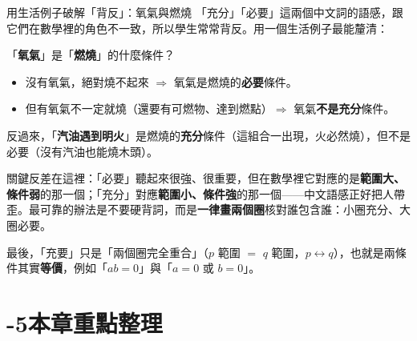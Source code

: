 \documentclass[11pt]{article}
\begin{document}
\begin{補充框}{用生活例子破解「背反」：氧氣與燃燒}
「充分」「必要」這兩個中文詞的語感，跟它們在數學裡的角色不一致，所以學生常常背反。用一個生活例子最能釐清：

「\textbf{氧氣}」是「\textbf{燃燒}」的什麼條件？
\begin{itemize}\setlength{\itemsep}{1pt}
\item 沒有氧氣，絕對燒不起來 $\Rightarrow$ 氧氣是燃燒的\textbf{必要}條件。
\item 但有氧氣不一定就燒（還要有可燃物、達到燃點）$\Rightarrow$ 氧氣\textbf{不是充分}條件。
\end{itemize}
反過來，「\textbf{汽油遇到明火}」是燃燒的\textbf{充分}條件（這組合一出現，火必然燒），但不是必要（沒有汽油也能燒木頭）。

關鍵反差在這裡：「必要」聽起來很強、很重要，但在數學裡它對應的是\textbf{範圍大、條件弱}的那一個；「充分」對應\textbf{範圍小、條件強}的那一個——中文語感正好把人帶歪。最可靠的辦法是不要硬背詞，而是\textbf{一律畫兩個圈}核對誰包含誰：小圈充分、大圈必要。

最後，「充要」只是「兩個圈完全重合」（$p$ 範圍 $=$ $q$ 範圍，$p\leftrightarrow q$），也就是兩條件其實\textbf{等價}，例如「$ab=0$」與「$a=0$ 或 $b=0$」。
\end{補充框}

\section*{-5\quad 本章重點整理}
\end{document}
